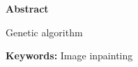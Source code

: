 \thispagestyle{empty}
\vspace{2 cm}
{\huge \bf Abstract}

\vspace{2 cm}
Genetic algorithm

\vspace{1 cm}
{\bf{Keywords:}} Image inpainting \\
\newpage